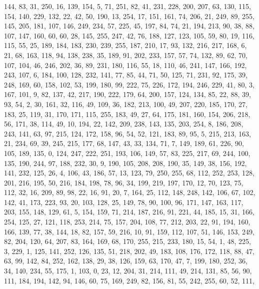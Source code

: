 \begin{DoxyCode}
       144, 83, 31, 250, 16, 139, 154, 5, 71, 251, 82, 41, 231, 228, 200, 207, 63, 130, 115, 154, 140, 229, 132, 22,
       42, 50, 190, 13, 254, 17, 151, 161, 74, 206, 21, 249, 89, 255, 145, 205, 181, 107, 146, 249, 234, 57, 225,
       45, 197, 84, 74, 21, 194, 213, 90, 38, 88, 107, 147, 160, 60, 60, 28, 145, 255, 247, 42, 76, 188, 127, 123,
       105, 59, 80, 19, 116, 115, 55, 25, 189, 184, 183, 230, 239, 255, 187, 210, 17, 93, 132, 216, 217, 168, 6,
       21, 68, 163, 118, 94, 138, 238, 35, 189, 91, 202, 233, 157, 57, 74, 132, 89, 62, 70, 107, 104, 46, 246, 202,
       36, 89, 231, 180, 116, 55, 18, 110, 46, 241, 147, 166, 192, 243, 107, 6, 184, 100, 128, 232, 141, 77, 85, 44,
       71, 50, 125, 71, 231, 92, 175, 39, 248, 169, 60, 158, 102, 53, 199, 180, 99, 222, 75, 226, 172, 194, 246,
       229, 41, 80, 3, 167, 101, 9, 82, 137, 42, 217, 190, 222, 179, 64, 200, 157, 124, 134, 85, 22, 88, 39, 93, 54,
       2, 30, 161, 32, 116, 49, 109, 36, 182, 213, 100, 49, 207, 220, 185, 170, 27, 183, 25, 119, 31, 170, 171,
       115, 255, 183, 49, 27, 64, 175, 181, 160, 154, 206, 218, 56, 171, 38, 114, 49, 10, 194, 22, 142, 209, 238,
       143, 135, 203, 254, 8, 186, 208, 243, 141, 63, 97, 215, 124, 172, 158, 96, 54, 52, 121, 183, 89, 95, 5, 215,
       213, 163, 21, 234, 69, 39, 245, 215, 177, 68, 147, 43, 33, 134, 71, 7, 149, 189, 61, 226, 90, 105, 189, 135,
       0, 124, 247, 222, 251, 193, 106, 149, 57, 83, 225, 217, 69, 244, 100, 135, 190, 244, 97, 188, 232, 30, 9,
       190, 105, 208, 208, 190, 35, 149, 38, 156, 192, 141, 232, 125, 26, 4, 106, 43, 186, 57, 13, 123, 79, 250, 255,
       68, 112, 252, 253, 128, 201, 216, 195, 50, 216, 184, 198, 78, 96, 34, 199, 219, 197, 170, 12, 70, 123, 75,
       112, 32, 16, 209, 89, 98, 22, 16, 91, 20, 7, 164, 25, 112, 148, 248, 142, 106, 67, 102, 142, 41, 173, 223,
       93, 20, 103, 128, 25, 149, 78, 90, 100, 96, 171, 147, 163, 117, 203, 155, 148, 129, 61, 5, 154, 159, 71, 214,
       187, 216, 91, 221, 44, 185, 15, 31, 166, 254, 125, 27, 121, 118, 253, 214, 75, 157, 204, 108, 77, 212, 203,
       22, 91, 194, 160, 166, 139, 77, 38, 144, 18, 82, 157, 59, 216, 10, 91, 159, 112, 107, 51, 146, 153, 249, 82,
       204, 120, 64, 207, 83, 164, 169, 68, 170, 255, 215, 233, 180, 15, 54, 1, 48, 225, 3, 229, 1, 125, 141, 252,
       126, 135, 51, 218, 202, 49, 183, 108, 176, 172, 118, 88, 47, 63, 99, 142, 84, 252, 162, 138, 29, 38, 126,
       159, 63, 170, 47, 7, 199, 180, 252, 36, 34, 140, 234, 55, 175, 1, 103, 0, 23, 12, 204, 31, 214, 111, 49, 214,
       131, 85, 56, 90, 111, 184, 194, 142, 94, 146, 60, 75, 169, 249, 82, 156, 81, 55, 242, 255, 60, 52, 111,

\end{DoxyCode}
